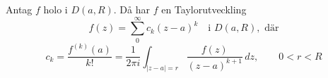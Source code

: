\begin{theorem}
Antag $f$ holo i $D(a, R)$. Då har $f$ en Taylorutveckling
\[ f(z) = \sum_0^\infty c_k(z - a)^k \quad \text{i } D(a, R), \text{ där} \]
\[ c_k = \frac{f^{(k)}(a)}{k!} = \frac{1}{2\pi i}\int_{|z - a| = r} \frac{f(z)}{(z - a)^{k + 1}}\,dz, \qquad 0 < r < R \]
\end{theorem}
